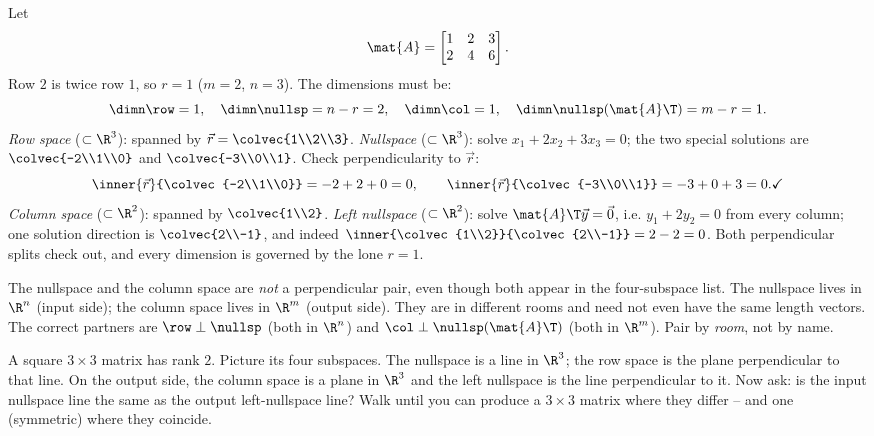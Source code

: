\begin{example}\label{ch16:four-numeric}
Let
\[
  \mat{A} = \begin{bmatrix} 1 & 2 & 3 \\ 2 & 4 & 6 \end{bmatrix}.
\]
Row $2$ is twice row $1$, so $r=1$ ($m=2$, $n=3$). The dimensions must be:
\[
  \dimn\row = 1,\quad \dimn\nullsp = n-r = 2,\quad
  \dimn\col = 1,\quad \dimn\nullsp(\mat{A}\T) = m-r = 1.
\]
\emph{Row space} ($\subset \R^3$): spanned by $\vec{r}=\colvec{1\\2\\3}$.
\emph{Nullspace} ($\subset \R^3$): solve $x_1 + 2x_2 + 3x_3 = 0$; the two special
solutions are $\colvec{-2\\1\\0}$ and $\colvec{-3\\0\\1}$. Check perpendicularity
to $\vec{r}$:
\[
  \inner{\vec r}{\colvec{-2\\1\\0}} = -2+2+0 = 0,\qquad
  \inner{\vec r}{\colvec{-3\\0\\1}} = -3+0+3 = 0. \checkmark
\]
\emph{Column space} ($\subset \R^2$): spanned by $\colvec{1\\2}$.
\emph{Left nullspace} ($\subset \R^2$): solve $\mat{A}\T\vec{y}=\vec0$, i.e.
$y_1 + 2y_2 = 0$ from every column; one solution direction is $\colvec{2\\-1}$,
and indeed $\inner{\colvec{1\\2}}{\colvec{2\\-1}} = 2-2 = 0$. \checkmark Both
perpendicular splits check out, and every dimension is governed by the lone
$r=1$.
\end{example}

\begin{trapbox}
The nullspace and the column space are \emph{not} a perpendicular pair, even
though both appear in the four-subspace list. The nullspace lives in $\R^n$
(input side); the column space lives in $\R^m$ (output side). They are in
different rooms and need not even have the same length vectors. The correct
partners are $\row \perp \nullsp$ (both in $\R^n$) and
$\col \perp \nullsp(\mat{A}\T)$ (both in $\R^m$). Pair by \emph{room}, not by name.
\end{trapbox}

\begin{walkbox}
A square $3\times 3$ matrix has rank $2$. Picture its four subspaces. The
nullspace is a line in $\R^3$; the row space is the plane perpendicular to that
line. On the output side, the column space is a plane in $\R^3$ and the left
nullspace is the line perpendicular to it. Now ask: is the input nullspace line
the same as the output left-nullspace line? Walk until you can produce a $3\times3$
matrix where they differ -- and one (symmetric) where they coincide.
\end{walkbox}

